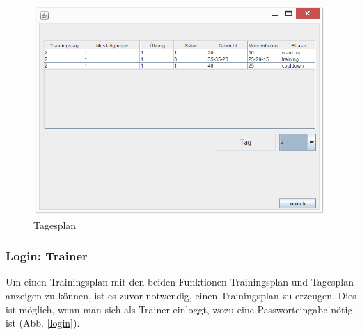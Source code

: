 \begin{figure}[h]
\includegraphics[width=1\hsize]{./images/tag.png}
\caption{Tagesplan}
\label{day}
\end{figure}
\newpage
\subsubsection*{Login: Trainer}

Um einen Trainingsplan mit den beiden Funktionen Trainingsplan und Tagesplan anzeigen zu können, ist es zuvor notwendig, einen Trainingsplan zu erzeugen. Dies ist möglich, wenn man sich als Trainer einloggt, wozu eine Passworteingabe nötig ist (Abb. \ref{login}).

